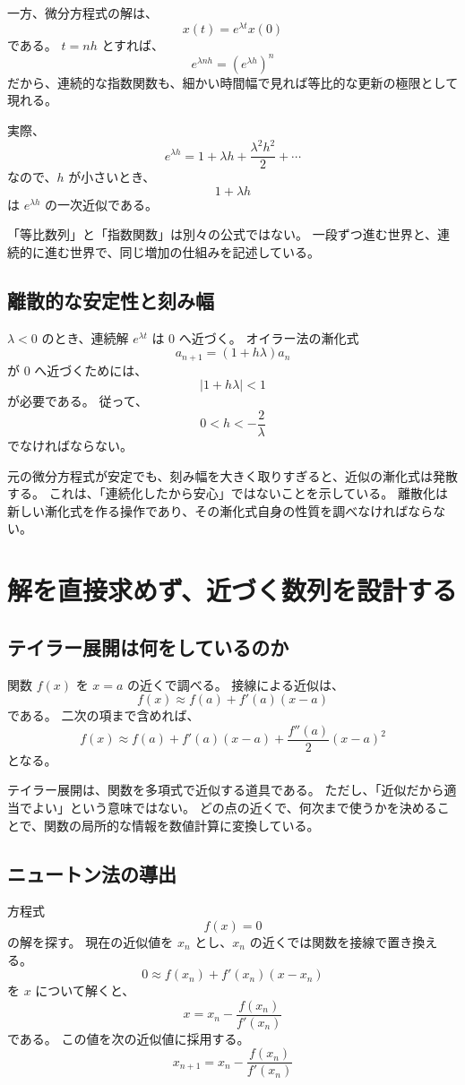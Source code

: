 一方、微分方程式の解は、
\[
  x(t)=e^{\lambda t}x(0)
\]
である。
$t=nh$ とすれば、
\[
  e^{\lambda nh}=\left(e^{\lambda h}\right)^n
\]
だから、連続的な指数関数も、細かい時間幅で見れば等比的な更新の極限として現れる。

実際、
\[
  e^{\lambda h}
  =1+\lambda h+\frac{\lambda^2h^2}{2}+\cdots
\]
なので、$h$ が小さいとき、
\[
  1+\lambda h
\]
は $e^{\lambda h}$ の一次近似である。

「等比数列」と「指数関数」は別々の公式ではない。
一段ずつ進む世界と、連続的に進む世界で、同じ増加の仕組みを記述している。

\subsection{離散的な安定性と刻み幅}

$\lambda<0$ のとき、連続解 $e^{\lambda t}$ は $0$ へ近づく。
オイラー法の漸化式
\[
  a_{n+1}=(1+h\lambda)a_n
\]
が $0$ へ近づくためには、
\[
  |1+h\lambda|<1
\]
が必要である。
従って、
\[
  0<h<-\frac2\lambda
\]
でなければならない。

元の微分方程式が安定でも、刻み幅を大きく取りすぎると、近似の漸化式は発散する。
これは、「連続化したから安心」ではないことを示している。
離散化は新しい漸化式を作る操作であり、その漸化式自身の性質を調べなければならない。

\section{解を直接求めず、近づく数列を設計する}

\subsection{テイラー展開は何をしているのか}

関数 $f(x)$ を $x=a$ の近くで調べる。
接線による近似は、
\[
  f(x)\approx f(a)+f'(a)(x-a)
\]
である。
二次の項まで含めれば、
\[
  f(x)
  \approx f(a)+f'(a)(x-a)
  +\frac{f''(a)}{2}(x-a)^2
\]
となる。

テイラー展開は、関数を多項式で近似する道具である。
ただし、「近似だから適当でよい」という意味ではない。
どの点の近くで、何次まで使うかを決めることで、関数の局所的な情報を数値計算に変換している。

\subsection{ニュートン法の導出}

方程式
\[
  f(x)=0
\]
の解を探す。
現在の近似値を $x_n$ とし、$x_n$ の近くでは関数を接線で置き換える。
\[
  0\approx f(x_n)+f'(x_n)(x-x_n)
\]
を $x$ について解くと、
\[
  x=x_n-\frac{f(x_n)}{f'(x_n)}
\]
である。
この値を次の近似値に採用する。
\[
  x_{n+1}=x_n-\frac{f(x_n)}{f'(x_n)}
\]

